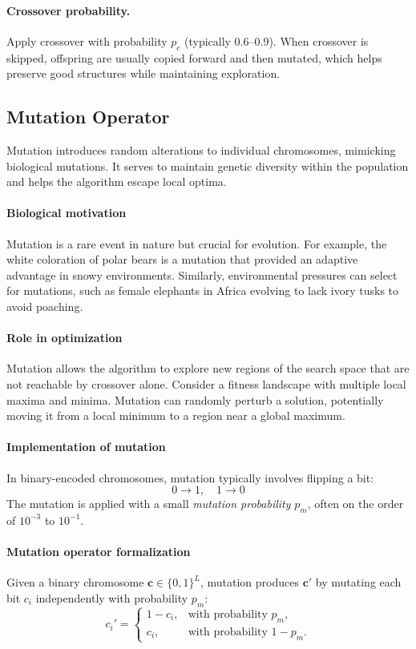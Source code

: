 \paragraph{Crossover probability.}
Apply crossover with probability \(p_c\) (typically 0.6--0.9). When crossover is skipped, offspring are usually copied forward and then mutated, which helps preserve good structures while maintaining exploration.

\subsection{Mutation Operator}
\label{sec:evo_mutation_operator}

Mutation introduces random alterations to individual chromosomes, mimicking biological mutations. It serves to maintain genetic diversity within the population and helps the algorithm escape local optima.

\paragraph{Biological motivation} Mutation is a rare event in nature but crucial for evolution. For example, the white coloration of polar bears is a mutation that provided an adaptive advantage in snowy environments. Similarly, environmental pressures can select for mutations, such as female elephants in Africa evolving to lack ivory tusks to avoid poaching.

\paragraph{Role in optimization} Mutation allows the algorithm to explore new regions of the search space that are not reachable by crossover alone. Consider a fitness landscape with multiple local maxima and minima. Mutation can randomly perturb a solution, potentially moving it from a local minimum to a region near a global maximum.

\paragraph{Implementation of mutation} In binary-encoded chromosomes, mutation typically involves flipping a bit:
\[
0 \to 1, \quad 1 \to 0
\]
The mutation is applied with a small \emph{mutation probability} \(p_m\), often on the order of \(10^{-3}\) to \(10^{-1}\).

\paragraph{Mutation operator formalization}
Given a binary chromosome \(\mathbf{c}\in\{0,1\}^L\), mutation produces \(\mathbf{c}'\) by mutating each bit \(c_i\) independently with probability \(p_m\):
\begin{equation}
c_i' = \begin{cases}
1 - c_i, & \text{with probability } p_m, \\
c_i, & \text{with probability } 1 - p_m.
\end{cases}
\label{eq:ga_bitflip_mutation}
\end{equation}

